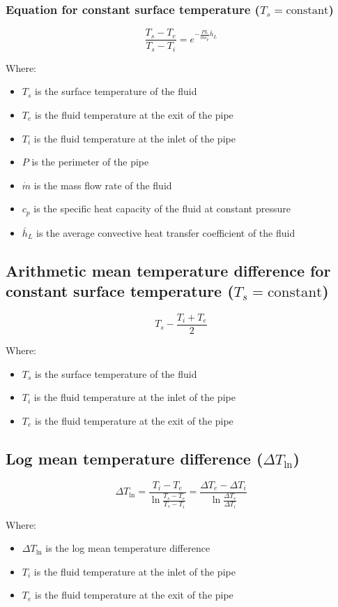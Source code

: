 \documentclass[11pt]{article}
\begin{document}
\subsubsection{Equation for constant surface temperature (\(T_s = \text{constant}\))}
\label{sec:org28cf40d}
\[\frac{T_s - T_e}{T_s - T_i} = e^{-\frac{PL}{\dot{m} c_p} \bar{h}_L}\]

Where:
\begin{itemize}
\item \(T_s\) is the surface temperature of the fluid
\item \(T_e\) is the fluid temperature at the exit of the pipe
\item \(T_i\) is the fluid temperature at the inlet of the pipe
\item \(P\) is the perimeter of the pipe
\item \(\dot{m}\) is the mass flow rate of the fluid
\item \(c_p\) is the specific heat capacity of the fluid at constant pressure
\item \(\bar{h}_L\) is the average convective heat transfer coefficient of the fluid
\end{itemize}

 \newpage

\subsection{Arithmetic mean temperature difference for constant surface temperature (\(T_s = \text{constant}\))}
\label{sec:orgdcdf57a}
\[T_s - \frac{T_i + T_e}{2}\]

Where:
\begin{itemize}
\item \(T_s\) is the surface temperature of the fluid
\item \(T_i\) is the fluid temperature at the inlet of the pipe
\item \(T_e\) is the fluid temperature at the exit of the pipe
\end{itemize}

\subsection{Log mean temperature difference (\(\Delta T_{\ln}\))}
\label{sec:org7e5d251}
\[\Delta T_{\ln} = \frac{T_i - T_e}{\ln \frac{T_s - T_e}{T_s - T_i}} = \frac{\Delta T_e - \Delta T_i}{\ln \frac{\Delta T_e}{\Delta T_i}}\]

Where:
\begin{itemize}
\item \(\Delta T_{\ln}\) is the log mean temperature difference
\item \(T_i\) is the fluid temperature at the inlet of the pipe
\item \(T_e\) is the fluid temperature at the exit of the pipe
\end{itemize}
\end{document}

